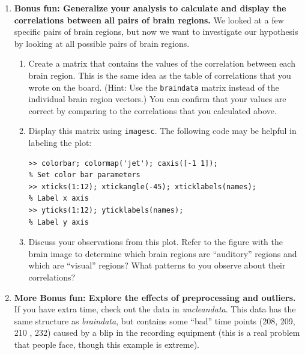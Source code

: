\begin{prob}
\begin{enumerate}
\item \textbf{Bonus fun: Generalize your analysis to calculate and display the correlations between all pairs of brain regions.} We looked at a few specific pairs of brain regions, but now we want to investigate our hypothesis by looking at all possible pairs of brain regions.
\begin{enumerate}
\item Create a matrix that contains the values of the correlation between each brain region. This is the same idea as the table of correlations that you wrote on the board. (Hint: Use the \texttt{braindata} matrix instead of the individual brain region vectors.) You can confirm that your values are correct by comparing to the correlations that you calculated above.
\item Display this matrix using \texttt{imagesc}. The following code may be helpful in labeling the plot:
\begin{verbatim}
>> colorbar; colormap('jet'); caxis([-1 1]); 
% Set color bar parameters
>> xticks(1:12); xtickangle(-45); xticklabels(names); 
% Label x axis
>> yticks(1:12); yticklabels(names); 
% Label y axis
\end{verbatim}
\item Discuss your observations from this plot. Refer to the figure with the brain image to determine which brain regions are ``auditory'' regions and which are ``visual'' regions? What patterns to you observe about their correlations?
\end{enumerate}


\item \textbf{More Bonus fun: Explore the effects of preprocessing and outliers.} If you have extra time, check out the data in \textit{uncleandata}. This data has the same structure as \textit{braindata}, but contains some ``bad'' time points (208, 209, 210 , 232) caused by a blip in the recording equipment (this is a real problem that people face, though this example is extreme).


\end{enumerate}
\end{prob}
